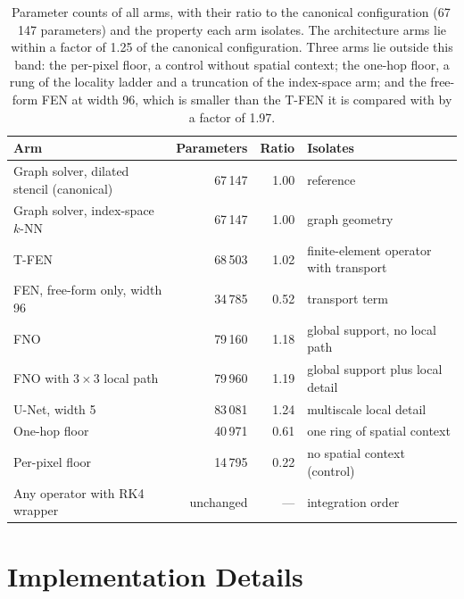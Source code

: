 \begin{table}[t]
  \centering
  \caption[Parameter counts of all arms.]{%
    Parameter counts of all arms, with their ratio to the canonical
    configuration (67\,147 parameters) and the property each arm isolates.
    The architecture arms lie within a factor of 1.25 of the canonical
    configuration. Three arms lie outside this band: the per-pixel floor,
    a control without spatial context; the one-hop floor, a rung of the
    locality ladder and a truncation of the index-space arm; and the
    free-form FEN at width 96, which is smaller than the T-FEN it is
    compared with by a factor of 1.97.}
  \label{tab:method:params}
  \small
  \begin{tabular}{p{} r r p{}}
    \toprule
    Arm & Parameters & Ratio & Isolates \\
    \midrule
    Graph solver, dilated stencil (canonical) & 67\,147 & 1.00 & reference \\
    Graph solver, index-space $k$-NN & 67\,147 & 1.00 & graph geometry \\
    T-FEN & 68\,503 & 1.02 & finite-element operator with transport \\
    FEN, free-form only, width 96 & 34\,785 & 0.52 & transport term \\
    FNO & 79\,160 & 1.18 & global support, no local path \\
    FNO with $3 \times 3$ local path & 79\,960 & 1.19 & global support plus
      local detail \\
    U-Net, width 5 & 83\,081 & 1.24 & multiscale local detail \\
    One-hop floor & 40\,971 & 0.61 & one ring of spatial context \\
    Per-pixel floor & 14\,795 & 0.22 & no spatial context (control) \\
    Any operator with RK4 wrapper & unchanged & --- & integration order \\
    \bottomrule
  \end{tabular}
\end{table}


\section{Implementation Details}
\label{sec:method:implementation}

